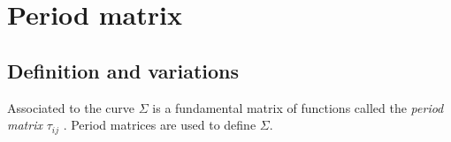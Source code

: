     
    
    
    
    
    
    
    
    \section{Period matrix}

    \subsection{Definition and variations}
        
    Associated to the curve \( \Sigma\) is a fundamental matrix of functions called the \emph{period matrix} \( \tau_{ij}\) \cite{period, bertola}. Period matrices are used to define \( \Sigma\).
    
